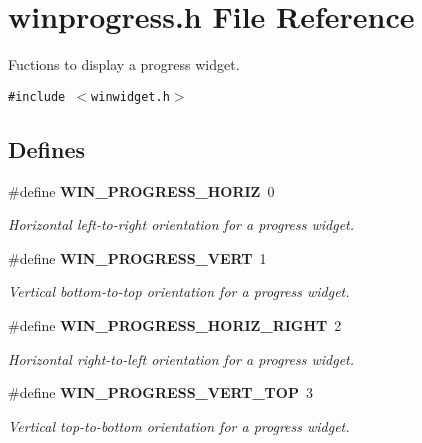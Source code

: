 \section{winprogress.h File Reference}
\label{winprogress_8h}
Fuctions to display a progress widget. 

{\tt \#include $<$winwidget.h$>$}\par
\subsection*{Defines}
\begin{CompactItemize}
\item 
\#define {\bf WIN\_\-PROGRESS\_\-HORIZ}~0
\begin{CompactList}\small\item\em Horizontal left-to-right orientation for a progress widget. \item\end{CompactList}\item 
\#define {\bf WIN\_\-PROGRESS\_\-VERT}~1
\begin{CompactList}\small\item\em Vertical bottom-to-top orientation for a progress widget. \item\end{CompactList}\item 
\#define {\bf WIN\_\-PROGRESS\_\-HORIZ\_\-RIGHT}~2
\begin{CompactList}\small\item\em Horizontal right-to-left orientation for a progress widget. \item\end{CompactList}\item 
\#define {\bf WIN\_\-PROGRESS\_\-VERT\_\-TOP}~3
\begin{CompactList}\small\item\em Vertical top-to-bottom orientation for a progress widget. \item\end{CompactList}\end{CompactItemize}
